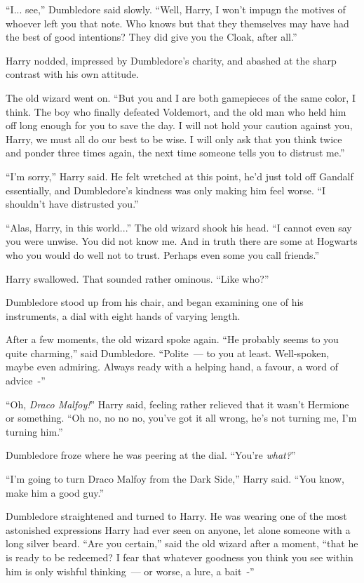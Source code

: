 ``I... see,'' Dumbledore said slowly. ``Well, Harry, I won't impugn the motives of whoever left you that note. Who knows but that they themselves may have had the best of good intentions? They did give you the Cloak, after all.''

Harry nodded, impressed by Dumbledore's charity, and abashed at the sharp contrast with his own attitude.

The old wizard went on. ``But you and I are both gamepieces of the same color, I think. The boy who finally defeated Voldemort, and the old man who held him off long enough for you to save the day. I will not hold your caution against you, Harry, we must all do our best to be wise. I will only ask that you think twice and ponder three times again, the next time someone tells you to distrust me.''

``I'm sorry,'' Harry said. He felt wretched at this point, he'd just told off Gandalf essentially, and Dumbledore's kindness was only making him feel worse. ``I shouldn't have distrusted you.''

``Alas, Harry, in this world...'' The old wizard shook his head. ``I cannot even say you were unwise. You did not know me. And in truth there are some at Hogwarts who you would do well not to trust. Perhaps even some you call friends.''

Harry swallowed. That sounded rather ominous. ``Like who?''

Dumbledore stood up from his chair, and began examining one of his instruments, a dial with eight hands of varying length.

After a few moments, the old wizard spoke again. ``He probably seems to you quite charming,'' said Dumbledore. ``Polite~--- to you at least. Well-spoken, maybe even admiring. Always ready with a helping hand, a favour, a word of advice~-''

``Oh, \emph{Draco Malfoy!}'' Harry said, feeling rather relieved that it wasn't Hermione or something. ``Oh no, no no no, you've got it all wrong, he's not turning me, I'm turning him.''

Dumbledore froze where he was peering at the dial. ``You're \emph{what?}''

``I'm going to turn Draco Malfoy from the Dark Side,'' Harry said. ``You know, make him a good guy.''

Dumbledore straightened and turned to Harry. He was wearing one of the most astonished expressions Harry had ever seen on anyone, let alone someone with a long silver beard. ``Are you certain,'' said the old wizard after a moment, ``that he is ready to be redeemed? I fear that whatever goodness you think you see within him is only wishful thinking~--- or worse, a lure, a bait~-''

